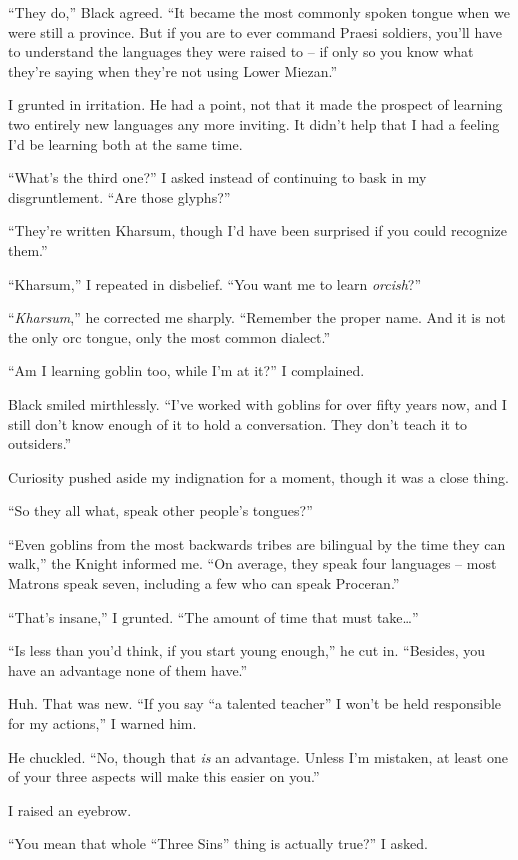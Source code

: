 \documentclass[12pt, openany]{book}
\begin{document}
“They do,” Black agreed. “It became the most commonly spoken tongue when we were still a province. But if you are to ever command Praesi soldiers, you’ll have to understand the languages they were raised to – if only so you know what they’re saying when they’re not using Lower Miezan.”

I grunted in irritation. He had a point, not that it made the prospect of learning two entirely new languages any more inviting. It didn’t help that I had a feeling I’d be learning both at the same time.

“What’s the third one?” I asked instead of continuing to bask in my disgruntlement. “Are those glyphs?”

“They’re written Kharsum, though I’d have been surprised if you could recognize them.”

“Kharsum,” I repeated in disbelief. “You want me to learn \textit{orcish}?”

“\textit{Kharsum},” he corrected me sharply. “Remember the proper name. And it is not the only orc tongue, only the most common dialect.”

“Am I learning goblin too, while I’m at it?” I complained.

Black smiled mirthlessly. “I’ve worked with goblins for over fifty years now, and I still don’t know enough of it to hold a conversation. They don’t teach it to outsiders.”

Curiosity pushed aside my indignation for a moment, though it was a close thing.

“So they all what, speak other people’s tongues?”

“Even goblins from the most backwards tribes are bilingual by the time they can walk,” the Knight informed me. “On average, they speak four languages – most Matrons speak seven, including a few who can speak Proceran.”

“That’s insane,” I grunted. “The amount of time that must take…”

“Is less than you’d think, if you start young enough,” he cut in. “Besides, you have an advantage none of them have.”

Huh. That was new. “If you say “a talented teacher” I won’t be held responsible for my actions,” I warned him.

He chuckled. “No, though that \textit{is }an advantage. Unless I’m mistaken, at least one of your three aspects will make this easier on you.”

I raised an eyebrow.

“You mean that whole “Three Sins” thing is actually true?” I asked.
\end{document}
